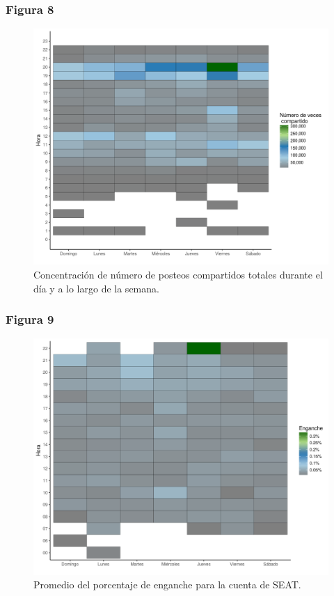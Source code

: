 \documentclass[a4paper,10pt]{article}
\begin{document}
\subsubsection{Figura 8}
\begin{figure}[H]
  \begin{center}
   \includegraphics[width=.85\textwidth]{imagenes/figura8.png}
      \captionsetup{width=.80\textwidth}
   \caption{\centering Concentración de número de posteos compartidos totales durante el día y a 
   lo largo de la semana.} 
  \end{center} 
\end{figure}

\subsubsection{Figura 9}
\begin{figure}[H]
  \begin{center}
   \includegraphics[width=.85\textwidth]{imagenes/figuraEnganche1.png}
      \captionsetup{width=.80\textwidth}
   \caption{\centering Promedio del porcentaje de enganche para la cuenta de SEAT.} 
  \end{center} 
\end{figure}
\end{document}

